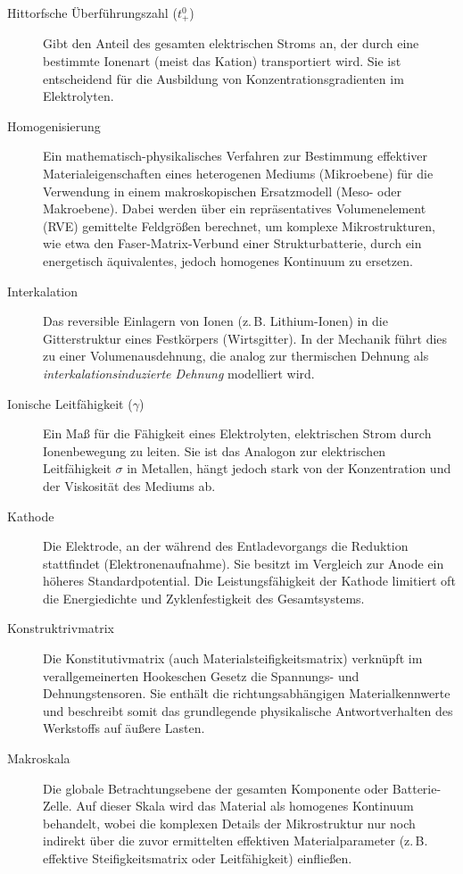 \begin{description}
    \item[Hittorfsche Überführungszahl ($t_+^0$)] Gibt den Anteil des gesamten elektrischen Stroms an, der durch eine bestimmte Ionenart (meist das Kation) transportiert wird. Sie ist entscheidend für die Ausbildung von Konzentrationsgradienten im Elektrolyten.
    
    \item[Homogenisierung] Ein mathematisch-physikalisches Verfahren zur Bestimmung effektiver Materialeigenschaften eines heterogenen Mediums (Mikroebene) für die Verwendung in einem makroskopischen Ersatzmodell (Meso- oder Makroebene). Dabei werden über ein repräsentatives Volumenelement (RVE) gemittelte Feldgrößen berechnet, um komplexe Mikrostrukturen, wie etwa den Faser-Matrix-Verbund einer Strukturbatterie, durch ein energetisch äquivalentes, jedoch homogenes Kontinuum zu ersetzen.
    
    \item[Interkalation] Das reversible Einlagern von Ionen (z.\,B. Lithium-Ionen) in die Gitterstruktur eines Festkörpers (Wirtsgitter). In der Mechanik führt dies zu einer Volumenausdehnung, die analog zur thermischen Dehnung als \textit{interkalationsinduzierte Dehnung} modelliert wird.
    
    \item[Ionische Leitfähigkeit ($\gamma$)] Ein Maß für die Fähigkeit eines Elektrolyten, elektrischen Strom durch Ionenbewegung zu leiten. Sie ist das Analogon zur elektrischen Leitfähigkeit $\sigma$ in Metallen, hängt jedoch stark von der Konzentration und der Viskosität des Mediums ab.
    
    \item[Kathode] Die Elektrode, an der während des Entladevorgangs die Reduktion stattfindet (Elektronenaufnahme). Sie besitzt im Vergleich zur Anode ein höheres Standardpotential. Die Leistungsfähigkeit der Kathode limitiert oft die Energiedichte und Zyklenfestigkeit des Gesamtsystems.
    
    \item[Konstruktrivmatrix] Die Konstitutivmatrix (auch Materialsteifigkeitsmatrix) verknüpft im verallgemeinerten Hookeschen Gesetz die Spannungs- und Dehnungstensoren. Sie enthält die richtungsabhängigen Materialkennwerte und beschreibt somit das grundlegende physikalische Antwortverhalten des Werkstoffs auf äußere Lasten.

    \item[Makroskala] Die globale Betrachtungsebene der gesamten Komponente oder Batterie-Zelle. Auf dieser Skala wird das Material als homogenes Kontinuum behandelt, wobei die komplexen Details der Mikrostruktur nur noch indirekt über die zuvor ermittelten effektiven Materialparameter (z.\,B. effektive Steifigkeitsmatrix oder Leitfähigkeit) einfließen.
    

\end{description}
